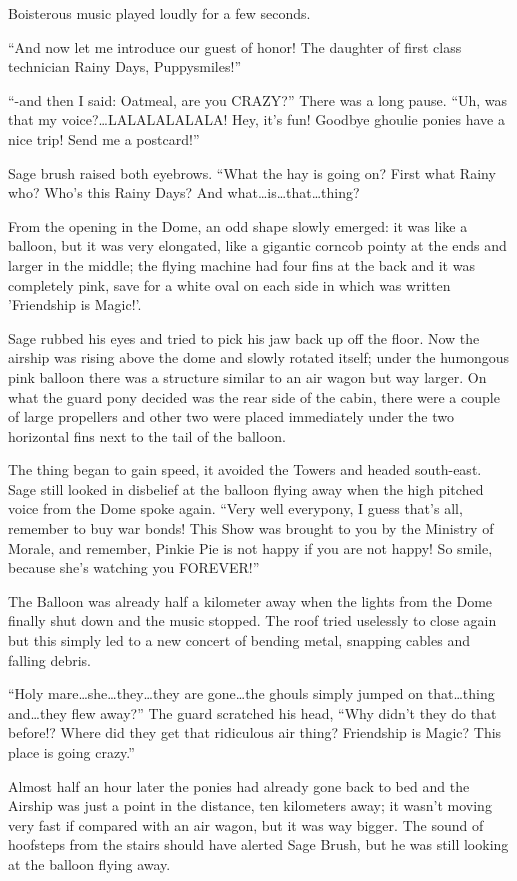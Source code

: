 Boisterous music played loudly for a few seconds.

``And now let me introduce our guest of honor! The daughter of first class technician Rainy Days, Puppysmiles!''

``-and then I said: Oatmeal, are you CRAZY?'' There was a long pause. ``Uh, was that my voice?\dots LALALALALALA! Hey, it's fun! Goodbye ghoulie ponies have a nice trip! Send me a postcard!''

Sage brush raised both eyebrows. ``What the hay is going on? First what Rainy who? Who's this Rainy Days? And what\dots is\dots that\dots thing?

From the opening in the Dome, an odd shape slowly emerged: it was like a balloon, but it was very elongated, like a gigantic corncob pointy at the ends and larger in the middle; the flying machine had four fins at the back and it was completely pink, save for a white oval on each side in which was written 'Friendship is Magic!'.

Sage rubbed his eyes and tried to pick his jaw back up off the floor. Now the airship was rising above the dome and slowly rotated itself; under the humongous pink balloon there was a structure similar to an air wagon but way larger. On what the guard pony decided was the rear side of the cabin, there were a couple of large propellers and other two were placed immediately under the two horizontal fins next to the tail of the balloon.

The thing began to gain speed, it avoided the Towers and headed south-east. Sage still looked in disbelief at the balloon flying away when the high pitched voice from the Dome spoke again. ``Very well everypony, I guess that's all, remember to buy war bonds! This Show was brought to you by the Ministry of Morale, and remember, Pinkie Pie is not happy if you are not happy! So smile, because she's watching you FOREVER!''

The Balloon was already half a kilometer away when the lights from the Dome finally shut down and the music stopped. The roof tried uselessly to close again but this simply led to a new concert of bending metal, snapping cables and falling debris.

``Holy mare\dots she\dots they\dots they are gone\dots the ghouls simply jumped on that\dots thing and\dots they flew away?'' The guard scratched his head, ``Why didn't they do that before!? Where did they get that ridiculous air thing? Friendship is Magic? This place is going crazy.''

Almost half an hour later the ponies had already gone back to bed and the Airship was just a point in the distance, ten kilometers away; it wasn't moving very fast if compared with an air wagon, but it was way bigger. The sound of hoofsteps from the stairs should have alerted Sage Brush, but he was still looking at the balloon flying away.

